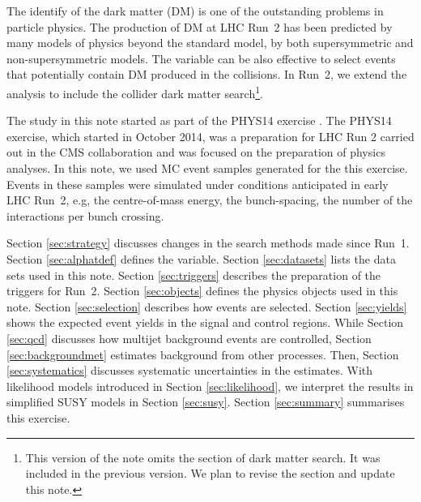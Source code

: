 The identify of the dark matter (DM) is one of the outstanding problems
in particle physics. The production of DM at LHC Run~2 has been
predicted by many models of physics beyond the standard model, by both
supersymmetric and non-supersymmetric models. The \alphat variable can
be also effective to select events that potentially contain DM produced
in the collisions. In Run~2, we extend the \alphat analysis to include
the collider dark matter search\footnote{This version of the note omits
the section of dark matter search. It was included in the previous
version. We plan to revise the section and update this note.}.

The study in this note started as part of the PHYS14 exercise
\cite{PHYS14}. The PHYS14 exercise, which started in October 2014, was a
preparation for LHC Run 2 carried out in the CMS collaboration and was
focused on the preparation of physics analyses. In this note, we used MC
event samples generated for the this exercise. Events in these samples
were simulated under conditions anticipated in early LHC Run~2, e.g, the
centre-of-mass energy, the bunch-spacing, the number of the interactions
per bunch crossing.

Section \ref{sec:strategy} discusses changes in the search methods made
since Run~1. Section \ref{sec:alphatdef} defines the \alphat variable.
Section \ref{sec:datasets} lists the data sets used in this note.
Section \ref{sec:triggers} describes the preparation of the triggers for
Run~2. Section \ref{sec:objects} defines the physics objects used in
this note. Section \ref{sec:selection} describes how events are
selected. Section \ref{sec:yields} shows the expected event yields in
the signal and control regions. While Section \ref{sec:qcd} discusses
how multijet background events are controlled, Section
\ref{sec:backgroundmet} estimates background from other processes. Then,
Section \ref{sec:systematics} discusses systematic uncertainties in the
estimates. With likelihood models introduced in Section
\ref{sec:likelihood}, we interpret the results in simplified SUSY models
in Section \ref{sec:susy}. Section \ref{sec:summary} summarises this
exercise.

